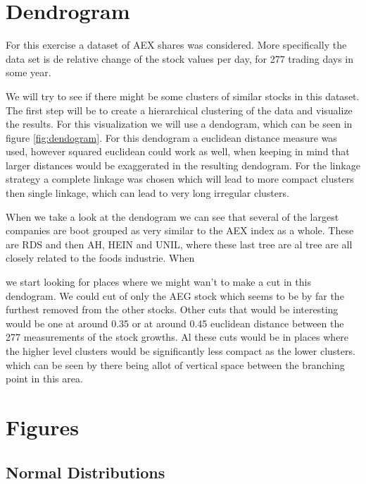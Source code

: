 \documentclass[10pt,a4paper]{article}
\begin{document}
\section{Dendrogram}
For this exercise a dataset of AEX shares was considered. More specifically the data set is de relative change of the stock values per day, for 277 trading days in some year. 

We will try to see if there might be some clusters of similar stocks in this dataset. The first step will be to create a hierarchical clustering of the data and visualize the results. For this visualization we will use a dendogram, which can be seen in figure \ref{fig:dendogram}. For this dendogram a euclidean distance measure was used, however squared euclidean could work as well, when keeping in mind that larger distances would be exaggerated in the resulting dendogram. For the linkage strategy a complete linkage was chosen which will lead to more compact clusters then single linkage, which can lead to very long irregular clusters.

When we take a look at the dendogram we can see that several of the largest companies are boot grouped as very similar to the AEX index as a whole. These are RDS and then AH, HEIN and UNIL, where these last tree are al tree are all closely related to the foods industrie. When 

we start looking for places where we might wan't to make a cut in this dendogram. We could cut of only the AEG stock which seems to be by far the furthest removed from the other stocks. Other cuts that would be interesting would be one at around 0.35 or at around 0.45 euclidean distance between the 277 measurements of the stock growths. Al these cuts would be in places where the higher level clusters would be significantly less compact as the lower clusters. which can be seen by there being allot of vertical space between the branching point in this area. 

\appendix
\section{Figures}
\subsection{Normal Distributions}

\end{document}
